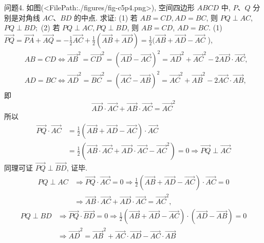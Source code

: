 问题4. 如图(<FilePath:./figures/fig-c5p4.png>), 空间四边形 $A B C D$ 中, $P 、 Q$ 分别是对角线 $A C 、 B D$ 的中点.
求证:
(1) 若 $A B=C D, A D=B C$, 则 $P Q \perp A C$, $P Q \perp B D ;$
(2) 若 $P Q \perp A C, P Q \perp B D$, 则 $A B=C D$, $A D=B C$.
(1) $\overrightarrow{P Q}=\overrightarrow{P A}+\overrightarrow{A Q}=-\frac{1}{2} \overrightarrow{A C}+\frac{1}{2}(\overrightarrow{A B}+\overrightarrow{A D})=\frac{1}{2}(\overrightarrow{A B}+\overrightarrow{A D}- \overrightarrow{A C}$ ),
$$
\begin{aligned}
& A B=C D \Leftrightarrow \overrightarrow{A B}^2=\overrightarrow{C D}^2=(\overrightarrow{A D}-\overrightarrow{A C})^2=\overrightarrow{A D}^2+\overrightarrow{A C}^2-2 \overrightarrow{A D} \cdot \overrightarrow{A C}, \\
& A D=B C \Leftrightarrow \overrightarrow{A D}^2=\overrightarrow{B C}^2=(\overrightarrow{A C}-\overrightarrow{A B})^2=\overrightarrow{A C}^2+\overrightarrow{A B}^2-2 \overrightarrow{A C} \cdot \overrightarrow{A B},
\end{aligned}
$$
即
$$
\overrightarrow{A D} \cdot \overrightarrow{A C}+\overrightarrow{A B} \cdot \overrightarrow{A C}=\overrightarrow{A C}^2
$$
所以
$$
\begin{aligned}
\overrightarrow{P Q} \cdot \overrightarrow{A C} & =\frac{1}{2}(\overrightarrow{A B}+\overrightarrow{A D}-\overrightarrow{A C}) \cdot \overrightarrow{A C} \\
& =\frac{1}{2}\left(\overrightarrow{A B} \cdot \overrightarrow{A C}+\overrightarrow{A D} \cdot \overrightarrow{A C}-\overrightarrow{A C}^2\right)=0 \Rightarrow \overrightarrow{P Q} \perp \overrightarrow{A C}
\end{aligned}
$$
同理可证 $\overrightarrow{P Q} \perp \overrightarrow{B D}$, 证毕.
$$
\begin{aligned}
P Q \perp A C & \Rightarrow \overrightarrow{P Q} \cdot \overrightarrow{A C}=0 \Rightarrow \frac{1}{2}(\overrightarrow{A B}+\overrightarrow{A D}-\overrightarrow{A C}) \cdot \overrightarrow{A C}=0 \\
& \Rightarrow \overrightarrow{A B} \cdot \overrightarrow{A C}+\overrightarrow{A D} \cdot \overrightarrow{A C}=\overrightarrow{A C}^2,
\end{aligned}
$$
$$
\begin{aligned}
P Q \perp B D & \Rightarrow \overrightarrow{P Q} \cdot \overrightarrow{B D}=0 \Rightarrow \frac{1}{2}(\overrightarrow{A B}+\overrightarrow{A D}-\overrightarrow{A C}) \cdot(\overrightarrow{A D}-\overrightarrow{A B})=0 \\
& \Rightarrow \overrightarrow{A D}^2=\overrightarrow{A B}^2+\overrightarrow{A C} \cdot \overrightarrow{A D}-\overrightarrow{A C} \cdot \overrightarrow{A B}
\end{aligned}
$$
